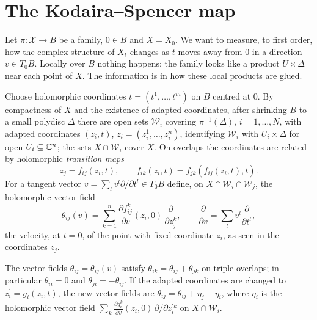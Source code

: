 \section{The Kodaira--Spencer map}\label{deformations:section-kodaira-spencer}

Let $\pi \colon \mathcal{X} \to B$ be a family, $0 \in B$ and $X = X_0$. We want to measure, to first order, how the complex structure of $X_t$ changes as $t$ moves away from $0$ in a direction $v \in T_0B$. Locally
over $B$ nothing happens: the family looks like a product $U \times \Delta$ near each point of $X$. The information is in how these local products are glued.

Choose holomorphic coordinates $t = (t^1, \ldots, t^m)$ on $B$ centred at $0$. By compactness of $X$ and the existence of adapted coordinates, after shrinking $B$ to a small polydisc $\Delta$ there are open
sets $\mathcal{W}_i$ covering $\pi^{-1}(\Delta)$, $i = 1, \ldots, N$, with adapted coordinates $(z_i, t)$, $z_i = (z_i^1, \ldots, z_i^n)$, identifying $\mathcal{W}_i$ with $U_i \times \Delta$ for open
$U_i \subseteq \mathbb{C}^n$; the sets $X \cap \mathcal{W}_i$ cover $X$. On overlaps the coordinates are related by holomorphic \emph{transition maps}
\[
z_j = f_{ij}(z_i, t), \qquad f_{ik}(z_i, t) = f_{jk}(f_{ij}(z_i, t), t).
\]
For a tangent vector $v = \sum_lv^l\partial/\partial t^l \in T_0B$ define, on $X \cap \mathcal{W}_i \cap \mathcal{W}_j$, the holomorphic vector field
\[
\theta_{ij}(v) = \sum_{k=1}^n\frac{\partial f_{ij}^k}{\partial v}(z_i, 0)\,\frac{\partial}{\partial z_j^k}, \qquad \frac{\partial}{\partial v} = \sum_lv^l\frac{\partial}{\partial t^l},
\]
the velocity, at $t = 0$, of the point with fixed coordinate $z_i$, as seen in the coordinates $z_j$.

\begin{lemma}\label{deformations:lemma-kodaira-spencer-cocycle}
The vector fields $\theta_{ij} = \theta_{ij}(v)$ satisfy $\theta_{ik} = \theta_{ij} + \theta_{jk}$ on triple overlaps; in particular $\theta_{ii} = 0$ and $\theta_{ji} = -\theta_{ij}$. If the adapted coordinates are
changed to $z_i^{\prime} = g_i(z_i, t)$, the new vector fields are $\theta_{ij}^{\prime} = \theta_{ij} + \eta_j - \eta_i$, where $\eta_i$ is the holomorphic vector field $\sum_k\frac{\partial g_i^k}{\partial v}(z_i, 0)\,\partial/\partial z_i^{\prime k}$
on $X \cap \mathcal{W}_i$.
\end{lemma}

